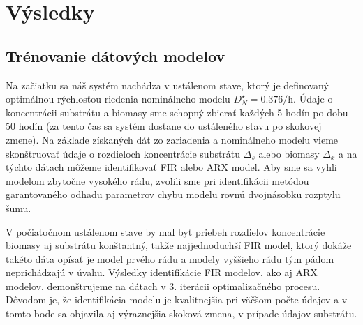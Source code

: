 \chapter{Výsledky}
\section{Trénovanie dátových modelov}
Na začiatku sa náš systém nachádza v ustálenom stave, ktorý je definovaný optimálnou rýchlosťou riedenia nominálneho modelu $ D_N^{\star}=0.376\si{\per\hour} $. Údaje o koncentrácii substrátu a biomasy sme schopný zbierať každých 5 hodín po dobu 50 hodín (za tento čas sa systém dostane do ustáleného stavu po skokovej zmene). Na základe získaných dát zo zariadenia a nominálneho modelu vieme skonštruovať údaje o rozdieloch koncentrácie substrátu $ \Delta_{s} $ alebo biomasy $ \Delta_{x} $ a na týchto dátach môžeme identifikovať FIR alebo ARX model. Aby sme sa vyhli modelom zbytočne vysokého rádu, zvolili sme pri identifikácii metódou garantovaného odhadu parametrov chybu modelu rovnú dvojnásobku rozptylu šumu. 

V počiatočnom ustálenom stave by mal byť priebeh rozdielov koncentrácie biomasy aj substrátu konštantný, takže najjednoduchší FIR model, ktorý dokáže takéto dáta opísať je model prvého rádu a modely vyššieho rádu tým pádom neprichádzajú v úvahu. Výsledky identifikácie FIR modelov, ako aj ARX modelov, demonštrujeme na dátach v 3. iterácii optimalizačného procesu. Dôvodom je, že identifikácia modelu je kvalitnejšia pri väčšom počte údajov a v tomto bode sa objavila aj výraznejšia skoková zmena, v prípade údajov substrátu.


